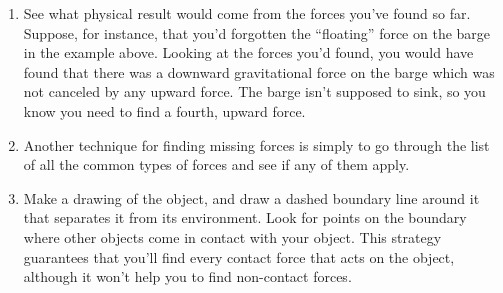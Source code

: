 \begin{enumerate}\label{checking-force-analysis}
\item See what physical result would come from the forces
you've found so far. Suppose, for instance, that you'd
forgotten the ``floating'' force on the barge in the example
above. Looking at the forces you'd found, you would have
found that there was a downward gravitational force on the
barge which was not canceled by any upward force. The barge
isn't supposed to sink, so you know you need to find a
fourth, upward force.

\item Another technique for finding missing forces is simply
to go through the list of all the common types of forces and
see if any of them apply.

\item Make a drawing of the object, and draw a dashed boundary
line around it that separates it from its environment. Look
for points on the boundary where other objects come in
contact with your object. This strategy guarantees that
you'll find every contact force that acts on the object,
although it won't help you to find non-contact forces.

\end{enumerate}

